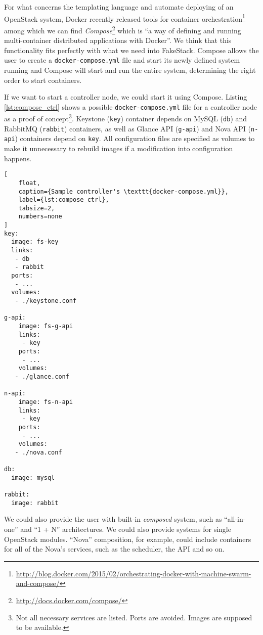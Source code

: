For what concerns the templating language and automate deploying of an OpenStack system, Docker recently released tools for container orchestration\footnote{\url{http://blog.docker.com/2015/02/orchestrating-docker-with-machine-swarm-and-compose/}} among which we can find \textit{Compose}\footnote{\url{http://docs.docker.com/compose/}} which is ``a way of defining and running multi-container distributed applications with Docker''. We think that this functionality fits perfectly with what we need into FakeStack. Compose allows the user to create a \texttt{docker-compose.yml} file and start its newly defined system running  and Compose will start and run the entire system, determining the right order to start containers.

If we want to start a controller node, we could start it using Compose. Listing \ref{lst:compose_ctrl} shows a possible \texttt{docker-compose.yml} file for a controller node as a proof of concept\footnote{Not all necessary services are listed. Ports are avoided. Images are supposed to be available.}. Keystone (\texttt{key}) container depends on MySQL (\texttt{db}) and RabbitMQ (\texttt{rabbit}) containers, as well as Glance API (\texttt{g-api}) and Nova API (\texttt{n-api}) containers depend on \texttt{key}. All configuration files are specified as volumes to make it unnecessary to rebuild images if a modification into configuration happens.

\begin{lstlisting}[
	float,
	caption={Sample controller's \texttt{docker-compose.yml}},
	label={lst:compose_ctrl},
	tabsize=2,
	numbers=none
]
key:
  image: fs-key
  links:
   - db
   - rabbit
  ports:
   - ...
  volumes:
   - ./keystone.conf

g-api:
	image: fs-g-api
	links:
	 - key
	ports:
	 - ...
	volumes:
   - ./glance.conf

n-api:
	image: fs-n-api
	links:
	 - key
	ports:
	 - ...
	volumes:
   - ./nova.conf

db:
  image: mysql

rabbit:
  image: rabbit
\end{lstlisting}

We could also provide the user with built-in \emph{composed} system, such as ``all-in-one'' and ``1 + N'' architectures. We could also provide systems for single OpenStack modules. ``Nova'' composition, for example, could include containers for all of the Nova's services, such as the scheduler, the API and so on.


